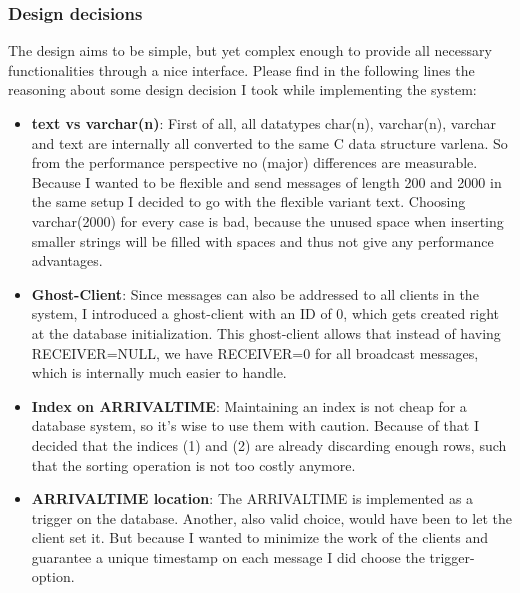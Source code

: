 \documentclass[11pt]{article}
\begin{document}
\subsubsection{Design decisions}\label{sec:design-decisions}
The design aims to be simple, but yet complex enough to provide all necessary functionalities through a nice interface. Please find in the following lines the reasoning about some design decision I took while implementing the system:
\begin{itemize}
	\item \textbf{text vs varchar(n)}: First of all, all datatypes char(n), varchar(n), varchar and text are internally all converted to the same C data structure varlena. So from the performance perspective no (major) differences are measurable. Because I wanted to be flexible and send messages of length 200 and 2000 in the same setup I decided to go with the flexible variant text. Choosing varchar(2000) for every case is bad, because the unused space when inserting smaller strings will be filled with spaces and thus not give any performance advantages.
	\item \textbf{Ghost-Client}: Since messages can also be addressed to all clients in the system, I introduced a ghost-client with an ID of 0, which gets created right at the database initialization. This ghost-client allows that instead of having RECEIVER=NULL, we have RECEIVER=0 for all broadcast messages, which is internally much easier to handle.
	\item \textbf{Index on ARRIVALTIME}: Maintaining an index is not cheap for a database system, so it's wise to use them with caution. Because of that I decided that the indices (1) and (2) are already discarding enough rows, such that the sorting operation is not too costly anymore.
	\item \textbf{ARRIVALTIME location}: The ARRIVALTIME is implemented as a trigger on the database. Another, also valid choice, would have been to let the client set it. But because I wanted to minimize the work of the clients and guarantee a unique timestamp on each message I did choose the trigger-option.
\end{itemize}
\end{document}
